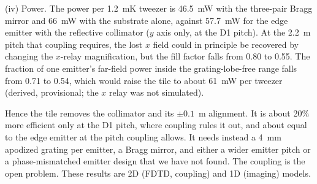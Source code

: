 (iv) Power. The power per 1.2~mK tweezer is 46.5~mW with the three-pair Bragg mirror and 66~mW with the substrate alone, against 57.7~mW for the edge emitter with the reflective collimator ($y$ axis only, at the D1 pitch). At the 2.2~\textmu m pitch that coupling requires, the lost $x$ field could in principle be recovered by changing the $x$-relay magnification, but the fill factor falls from 0.80 to 0.55. The fraction of one emitter's far-field power inside the grating-lobe-free range falls from 0.71 to 0.54, which would raise the tile to about 61~mW per tweezer (derived, provisional; the $x$ relay was not simulated).

Hence the tile removes the collimator and its $\pm0.1$~\textmu m alignment. It is about 20\% more efficient only at the D1 pitch, where coupling rules it out, and about equal to the edge emitter at the pitch coupling allows. It needs instead a 4~mm apodized grating per emitter, a Bragg mirror, and either a wider emitter pitch or a phase-mismatched emitter design that we have not found. The coupling is the open problem. These results are 2D (FDTD, coupling) and 1D (imaging) models.
